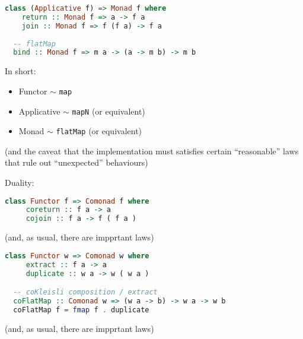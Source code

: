 \documentclass[10pt]{beamer}
\begin{document}
\begin{frame}[fragile]
  \begin{lstlisting}[language=haskell, basicstyle=\ttfamily]
  class (Applicative f) => Monad f where 
    return :: Monad f => a -> f a 
    join :: Monad f => f (f a) -> f a 
  
  -- flatMap
  bind :: Monad f => m a -> (a -> m b) -> m b 
  \end{lstlisting}
\end{frame}

\begin{frame}[fragile]
  In short:
  \begin{itemize}
    \item Functor $\sim$ \verb|map| 
    \item Applicative $\sim$  \verb|mapN|  (or equivalent) 
    \item Monad $\sim$  \verb|flatMap|  (or equivalent) 
  \end{itemize}

  (and the caveat that the implementation must satisfies certain ``reasonable'' laws that rule out ``unexpected'' behaviours)
\end{frame}

\begin{frame}[fragile]
  Duality:
  \begin{lstlisting}[language=haskell, basicstyle=\ttfamily]
  class Functor f => Comonad f where 
     coreturn :: f a -> a 
     cojoin :: f a -> f ( f a ) 
  \end{lstlisting}
  (and, as usual, there are impprtant laws) 
\end{frame}

\begin{frame}[fragile]
  \begin{lstlisting}[language=haskell, basicstyle=\ttfamily]
  class Functor w => Comonad w where 
     extract :: f a -> a 
     duplicate :: w a -> w ( w a ) 

  -- coKleisli composition / extract
  coFlatMap :: Comonad w => (w a -> b) -> w a -> w b
  coFlatMap f = fmap f . duplicate
  \end{lstlisting}
  (and, as usual, there are impprtant laws) 
\end{frame}
\end{document}
